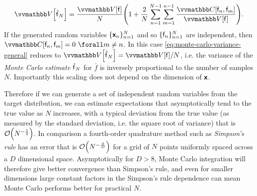 \begin{align}\label{eq:monte-carlo-variance-general}
  \var{\hatf_N}
  =
  \frac{\var{\rvar{f}}}{N}
  \lpa 
    1 +\frac{2}{N}\sum_{n=1}^{N-1} \sum_{m=1}^{n-1} \frac{\cov{\rvar{f}_n, \rvar{f}_m}}{\var{\rvar{f}}}
  \rpa.
\end{align}
If the generated random variables $\lbrace \boldsymbol{\mathsf{x}}_n\rbrace_{n=1}^N$ and so $\lbrace \mathsf{f}_n\rbrace_{n=1}^N$ are independent, then $\cov{\rvar{f}_n, \rvar{f}_m} = 0 ~\forall m\neq n$. In this case \eqref{eq:monte-carlo-variance-general} reduces to $ \var{\hatf_N} = \var{\rvar{f}} / {N}$, 
i.e. the variance of the \emph{Monte Carlo estimate} $\hatf_N$ for $\bar{f}$ is inversely proportional to the number of samples $N$. Importantly this scaling does not depend on the dimension of $\boldsymbol{\mathsf{x}}$. 

Therefore if we can generate a set of independent random variables from the target distribution, we can estimate expectations that asymptotically tend to the true value as $N$ increases, with a typical deviation from the true value (as measured by the standard deviation, i.e. the square root of variance) that is $\mathcal{O}\lpa N^{-\frac{1}{2}}\rpa$. In comparison a fourth-order quadrature method such as \emph{Simpson's rule} has an error that is $\mathcal{O}\lpa N^{-\frac{4}{D}}\rpa$ for a grid of $N$ points uniformly spaced across a $D$ dimensional space. Asymptotically for $D > 8$, Monte Carlo integration will therefore give better convergence than Simpson's rule, and even for smaller dimensions large constant factors in the Simpson's rule dependence can mean Monte Carlo performs better for practical $N$.

